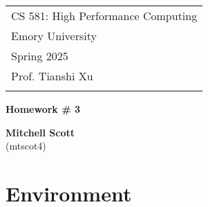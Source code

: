 \documentclass[a4paper,12pt]{article}
\theoremstyle{definition}
\theoremstyle{remark}
\begin{document}
	
	
	
	
	
	\thispagestyle{empty} %
	
	\begin{tabular}{p{15.5cm}} %
		{\large \sc CS 581:  High Performance Computing} \\
		Emory University \\ Spring 2025 \\ Prof. Tianshi Xu \\
		\hline %
		\\
	\end{tabular} %
	
	\vspace*{0.3cm} %
	
	\begin{center} %
		{\Large \bf Homework \# 3} %
		\vspace{2mm}
		
		{\bf Mitchell Scott}\\ (mtscot4) %
		
	\end{center}  
	
	\vspace{0.4cm}
	
	
	
	\section{Environment}
\end{document}
